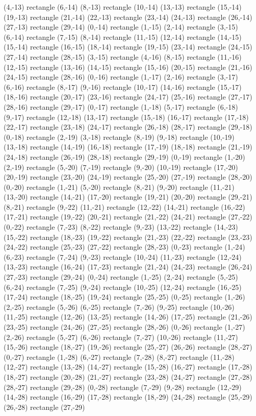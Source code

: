 {  (4,-13) rectangle (6,-14) (8,-13) rectangle (10,-14) (13,-13) rectangle (15,-14) (19,-13) rectangle (21,-14) (22,-13) rectangle (23,-14) (24,-13) rectangle (26,-14) (27,-13) rectangle (29,-14)%
  (0,-14) rectangle (1,-15) (2,-14) rectangle (3,-15) (6,-14) rectangle (7,-15) (8,-14) rectangle (11,-15) (12,-14) rectangle (14,-15) (15,-14) rectangle (16,-15) (18,-14) rectangle (19,-15) (23,-14) rectangle (24,-15) (27,-14) rectangle (28,-15)%
  (3,-15) rectangle (4,-16) (8,-15) rectangle (11,-16) (12,-15) rectangle (13,-16) (14,-15) rectangle (15,-16) (20,-15) rectangle (21,-16) (24,-15) rectangle (28,-16)%
  (0,-16) rectangle (1,-17) (2,-16) rectangle (3,-17) (6,-16) rectangle (8,-17) (9,-16) rectangle (10,-17) (14,-16) rectangle (15,-17) (18,-16) rectangle (20,-17) (23,-16) rectangle (24,-17) (25,-16) rectangle (27,-17) (28,-16) rectangle (29,-17)%
  (0,-17) rectangle (1,-18) (5,-17) rectangle (6,-18) (9,-17) rectangle (12,-18) (13,-17) rectangle (15,-18) (16,-17) rectangle (17,-18) (22,-17) rectangle (23,-18) (24,-17) rectangle (26,-18) (28,-17) rectangle (29,-18)%
  (0,-18) rectangle (2,-19) (3,-18) rectangle (8,-19) (9,-18) rectangle (10,-19) (13,-18) rectangle (14,-19) (16,-18) rectangle (17,-19) (18,-18) rectangle (21,-19) (24,-18) rectangle (26,-19) (28,-18) rectangle (29,-19)%
  (0,-19) rectangle (1,-20) (2,-19) rectangle (5,-20) (7,-19) rectangle (9,-20) (10,-19) rectangle (17,-20) (20,-19) rectangle (23,-20) (24,-19) rectangle (25,-20) (27,-19) rectangle (28,-20)%
  (0,-20) rectangle (1,-21) (5,-20) rectangle (8,-21) (9,-20) rectangle (11,-21) (13,-20) rectangle (14,-21) (17,-20) rectangle (19,-21) (20,-20) rectangle (29,-21)%
  (8,-21) rectangle (9,-22) (11,-21) rectangle (12,-22) (14,-21) rectangle (16,-22) (17,-21) rectangle (19,-22) (20,-21) rectangle (21,-22) (24,-21) rectangle (27,-22)%
  (0,-22) rectangle (7,-23) (8,-22) rectangle (9,-23) (13,-22) rectangle (14,-23) (15,-22) rectangle (18,-23) (19,-22) rectangle (21,-23) (22,-22) rectangle (23,-23) (24,-22) rectangle (25,-23) (27,-22) rectangle (28,-23)%
  (0,-23) rectangle (1,-24) (6,-23) rectangle (7,-24) (9,-23) rectangle (10,-24) (11,-23) rectangle (12,-24) (13,-23) rectangle (16,-24) (17,-23) rectangle (21,-24) (24,-23) rectangle (26,-24) (27,-23) rectangle (29,-24)%
  (0,-24) rectangle (1,-25) (2,-24) rectangle (5,-25) (6,-24) rectangle (7,-25) (9,-24) rectangle (10,-25) (12,-24) rectangle (16,-25) (17,-24) rectangle (18,-25) (19,-24) rectangle (25,-25)%
  (0,-25) rectangle (1,-26) (2,-25) rectangle (5,-26) (6,-25) rectangle (7,-26) (9,-25) rectangle (10,-26) (11,-25) rectangle (12,-26) (13,-25) rectangle (14,-26) (17,-25) rectangle (21,-26) (23,-25) rectangle (24,-26) (27,-25) rectangle (28,-26)%
  (0,-26) rectangle (1,-27) (2,-26) rectangle (5,-27) (6,-26) rectangle (7,-27) (10,-26) rectangle (11,-27) (15,-26) rectangle (18,-27) (19,-26) rectangle (25,-27) (26,-26) rectangle (28,-27)%
  (0,-27) rectangle (1,-28) (6,-27) rectangle (7,-28) (8,-27) rectangle (11,-28) (12,-27) rectangle (13,-28) (14,-27) rectangle (15,-28) (16,-27) rectangle (17,-28) (18,-27) rectangle (20,-28) (21,-27) rectangle (23,-28) (24,-27) rectangle (27,-28) (28,-27) rectangle (29,-28)%
  (0,-28) rectangle (7,-29) (9,-28) rectangle (12,-29) (14,-28) rectangle (16,-29) (17,-28) rectangle (18,-29) (24,-28) rectangle (25,-29) (26,-28) rectangle (27,-29)%
}
